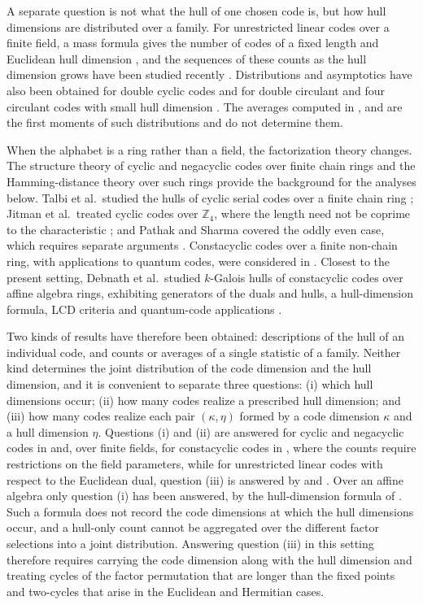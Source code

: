 \documentclass[10pt,a4paper]{article}
\numberwithin{equation}{section}
\theoremstyle{plain}
\theoremstyle{definition}
\theoremstyle{remark}
\begin{document}
A separate question is not what the hull of one chosen code is, but how hull
dimensions are distributed over a family. For unrestricted linear codes over a
finite field, a mass formula gives the number of codes of a fixed length and
Euclidean hull dimension \cite{sendrier1997}, and the sequences of these counts
as the hull dimension grows have been studied recently \cite{bouyuklieva2026}.
Distributions and asymptotics have also been obtained for double cyclic codes
\cite{gao2023} and for double circulant and four circulant codes with small hull
dimension \cite{aliabadi2026}. The averages computed in \cite{skersys2003},
\cite{jitmanSangwisut2018} and \cite{debnathAverage2025} are the first moments of
such distributions and do not determine them.

When the alphabet is a ring rather than a field, the factorization theory
changes. The structure theory of cyclic and negacyclic codes over finite chain
rings \cite{dinhLopezPermouth2004} and the Hamming-distance theory over such
rings \cite{nortonSalagean2000} provide the background for the analyses below.
Talbi et al.\ studied the hulls of cyclic serial codes over a finite chain ring
\cite{talbi2022}; Jitman et al.\ treated cyclic codes over $\mathbb{Z}_4$, where
the length need not be coprime to the characteristic \cite{jitmanZ4}; and Pathak
and Sharma covered the oddly even case, which requires separate arguments
\cite{pathakZ4}. Constacyclic codes over a finite non-chain ring, with
applications to quantum codes, were considered in \cite{zhang2026}. Closest to
the present setting, Debnath et al.\ studied $k$-Galois hulls of constacyclic
codes over affine algebra rings, exhibiting generators of the duals and hulls, a
hull-dimension formula, LCD criteria and quantum-code applications
\cite{debnathAffine2026}.

Two kinds of results have therefore been obtained: descriptions of the hull of
an individual code, and counts or averages of a single statistic of a family.
Neither kind determines the joint distribution of the code dimension and the
hull dimension, and it is convenient to separate three questions: (i) which hull
dimensions occur; (ii) how many codes realize a prescribed hull dimension; and
(iii) how many codes realize each pair $(\kappa,\eta)$ formed by a code
dimension $\kappa$ and a hull dimension $\eta$. Questions (i) and (ii) are
answered for cyclic and negacyclic codes in \cite{sangwisut2015} and, over
finite fields, for constacyclic codes in \cite{debnathConstacyclic2023}, where
the counts require restrictions on the field parameters, while for unrestricted
linear codes with respect to the Euclidean dual, question (iii) is answered by
\cite{sendrier1997} and \cite{bouyuklieva2026}. Over an affine algebra only
question (i) has been answered, by the hull-dimension formula of
\cite{debnathAffine2026}. Such a formula does not record the code dimensions at
which the hull dimensions occur, and a hull-only count cannot be aggregated over
the different factor selections into a joint distribution. Answering question
(iii) in this setting therefore requires carrying the code dimension along with
the hull dimension and treating cycles of the factor permutation that are longer
than the fixed points and two-cycles that arise in the Euclidean and Hermitian
cases.
\end{document}
